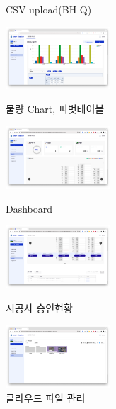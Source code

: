 \begin{itemize}[label=]
\begin{figure}[!ht]
\begin{fullwidth}
{				      \caption*{CSV upload(BH-Q)}
			      }
			      \parbox{0.35\textwidth}{
				      \centering
				      \includegraphics[width=0.35\textwidth]{images/smart-checker-csv-upload-pivot.png}
				      \caption*{물량 Chart, 피벗테이블}
			      }\qquad
			      \parbox{0.35\textwidth}{
				      \centering
				      \includegraphics[width=0.35\textwidth]{images/smart-checker-dashboard.png}
				      \caption*{Dashboard}
			      }\qquad
			      \parbox{0.35\textwidth}{
				      \centering
				      \includegraphics[width=0.35\textwidth]{images/smart-checker-approval-status.png}
				      \caption*{시공사 승인현황}
			      }\qquad
			      \parbox{0.35\textwidth}{
				      \centering
				      \includegraphics[width=0.35\textwidth]{images/smart-checker-file-browser.png}
				      \caption*{클라우드 파일 관리}
			      }
		      \end{fullwidth}
	      \end{figure}


\end{itemize}
